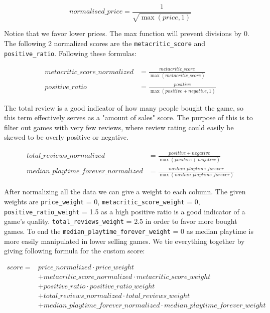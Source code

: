 \documentclass{article}
\begin{document}
	$$normalised\_price = \frac{1}{\sqrt{\max{\left(price, 1\right)}}}$$
	
	Notice that we favor lower prices. The max function will prevent divisions by 0.\\
	The following 2 normalized scores are the \texttt{metacritic\_score} and \texttt{positive\_ratio}. Following these formulas:
	
	\begin{align}
		metacritic\_score\_normalized &= \frac{metacritic\_score}{\max{\left(metacritic\_score\right)}} \\
		positive\_ratio &= \frac{positive}{\max{\left(positive + negative, 1\right)}}
	\end{align}
	
	The total review is a good indicator of how many people bought the game, so this term effectively serves as a "amount of sales" score. The purpose of this is to filter out games with very few reviews, where review rating could easily be skewed to be overly positive or negative.
	
	\begin{align}
		total\_reviews\_normalized &= \frac{positive + negative}{\max{\left(positive + negative\right)}}\\
		median\_playtime\_forever\_normalized &= \frac{median\_playtime\_forever}{\max{\left(median\_playtime\_forever\right)}}	
	\end{align}
		
	After normalizing all the data we can give a weight to each column. The given weights are \texttt{price\_weight} = 0, \texttt{metacritic\_score\_weight} = 0, \texttt{positive\_ratio\_weight} = 1.5 as a high positive ratio is a good indicator of a game's quality. \texttt{total\_reviews\_weight} = 2.5 in order to favor more bought games. To end the \texttt{median\_playtime\_forever\_weight} = 0 as median playtime is more easily manipulated in lower selling games. 
    We tie everything together by giving following formula for the custom score:
	
	\begin{align}
		score = &price\_normalized\cdot price\_weight\\
		 &+ metacritic\_score\_normalized\cdot metacritic\_score\_weight\\
		 &+ positive\_ratio\cdot positive\_ratio\_weight\\
		 &+ total\_reviews\_normalized\cdot total\_reviews\_weight\\
		 &+ median\_playtime\_forever\_normalized\cdot median\_playtime\_forever\_weight
	\end{align}
	
\end{document}
